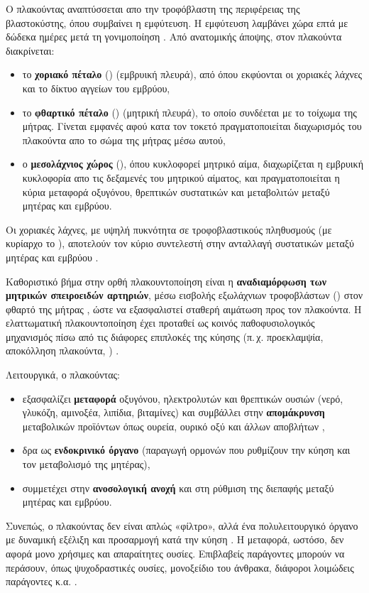 Ο πλακούντας αναπτύσσεται απο την τροφόβλαστη της περιφέρειας της βλαστοκύστης, όπου συμβαίνει η εμφύτευση.
Η εμφύτευση λαμβάνει χώρα επτά με δώδεκα ημέρες μετά τη γονιμοποίηση \cite{https://doi.org/10.1111/aogs.13834}.
Από ανατομικής άποψης, στον πλακούντα διακρίνεται:
\begin{itemize}
  \item το \textbf{χοριακό πέταλο }() (εμβρυική πλευρά), από όπου εκφύονται οι χοριακές λάχνες και το δίκτυο αγγείων του εμβρύου,
  \item το \textbf{φθαρτικό πέταλο }() (μητρική πλευρά), το οποίο συνδέεται με το τοίχωμα της μήτρας. Γίνεται εμφανές αφού κατα τον τοκετό πραγμα\-τοποιείται διαχωρισμός του πλακούντα απο το σώμα της μήτρας μέσω αυτού,
  \item ο \textbf{μεσολάχνιος χώρος }(), όπου κυκλοφορεί μητρικό αίμα, διαχωρίζεται η εμβρυική κυκλοφορία απο τις δεξαμενές του μητρικού αίματος, και πραγμα\-τοποιείται η κύρια μεταφορά οξυγόνου, θρεπτικών συστατικών και μεταβολιτών μεταξύ μητέρας και εμβρύου.
\end{itemize}
Οι χοριακές λάχνες, με υψηλή πυκνότητα σε τροφοβλαστικούς πληθυσμούς (με κυρίαρχο το ), αποτελούν τον κύριο συντελεστή στην ανταλλαγή συστατικών μεταξύ μητέρας και εμβρύου \cite{gude2004growth,maltepe2015forgotten}.


Καθοριστικό βήμα στην ορθή πλακουντοποίηση είναι η \textbf{αναδιαμόρφωση των μητρι\-κών σπειροειδών αρτηριών}, μέσω
εισβολής εξωλάχνιων τροφοβλάστων () στον φθαρτό της μήτρας , ώστε να εξασφαλιστεί σταθερή αιμάτωση προς τον
πλακούντα. Η ελατ\-τωματική πλακουντοποίηση έχει προταθεί ως κοινός παθοφυσιολογικός μηχανισμός πίσω από τις διάφορες επιπλοκές της κύησης (π.\,χ. προεκλαμψία, αποκόλληση πλακούντα, )
\cite{brosens2011deepplacentation,maltepe2010placenta}.

Λειτουργικά, ο πλακούντας:
\begin{itemize}
  \item εξασφαλίζει \textbf{μεταφορά} οξυγόνου, ηλεκτρολυτών και θρεπτικών ουσιών (νερό, γλυκόζη, αμινοξέα, λιπίδια, βιταμίνες) και συμβάλλει στην \textbf{απομάκρυνση} μεταβολικών προϊ\-όντων όπως ουρεία, ουρικό οξύ και άλλων αποβλήτων \cite{embrplace},
  \item δρα ως \textbf{ενδοκρινικό όργανο} (παραγωγή ορμονών που ρυθμίζουν την κύηση και τον μεταβολισμό της μητέρας),
  \item συμμετέχει στην \textbf{ανοσολογική ανοχή} και στη ρύθμιση της διεπαφής μεταξύ μητέρας και εμβρύου.
\end{itemize}
Συνεπώς, ο πλακούντας δεν είναι απλώς «φίλτρο», αλλά ένα πολυλειτουργικό όργανο με δυναμική
εξέλιξη και προσαρμογή κατά την κύηση \cite{burton2015placenta,maltepe2015forgotten}. 
Η μεταφορά, ωστόσο, δεν αφορά μονο χρήσιμες και απαραίτητες ουσίες. Επιβλαβείς παράγοντες μπορούν 
να περάσουν, όπως ψυχοδραστικές ουσίες, μονοξείδιο του άνθρακα, διάφοροι λοιμώδεις παράγοντες κ.α. \cite{embrplace}.


